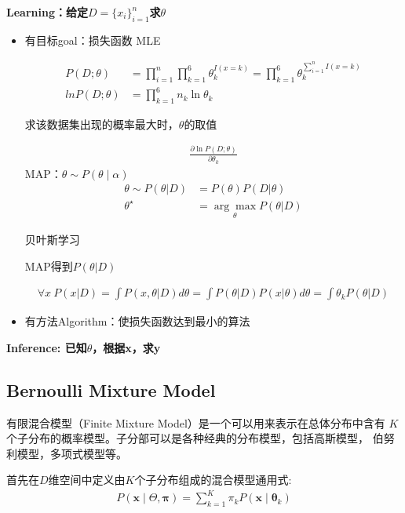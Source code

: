 \documentclass[UTF8]{ctexart}
\begin{document}
\textbf{Learning：给定$D=\{x_i\}_{i=1}^{n}$求$\theta$}
\begin{itemize}
    \item 有目标goal：损失函数
        \subitem MLE  
        
        $$
        \begin{aligned}
        P(D;\theta)&=\prod^{n}_{i=1}\prod^{6}_{k=1}\theta_k^{I(x=k)}=\prod^{6}_{k=1}\theta_k^{\sum^{n}_{i=1}I(x=k)}  \\
        lnP(D;\theta)&=\prod^{6}_{k=1}n_k\ln\theta_k
        \end{aligned}
        $$

        \subsubitem 求该数据集出现的概率最大时，$\theta$的取值
			
        $$
        \begin{aligned}
            \frac{\partial \ln P(D;\theta)}{\partial \theta_k}
        \end{aligned}
        $$ 
        \subitem MAP：$\theta \sim P(\theta\mid\alpha)$
        $$
        \begin{aligned}
        \theta\sim P(\theta|D)&=P(\theta)P(D|\theta)\\
        \theta^{\star}&=\underset{\theta}{\arg \max}P(\theta|D)
        \end{aligned}
        $$

        \subitem 贝叶斯学习

           \subsubitem MAP得到$P(\theta|D)$
			
            $$
            \begin{aligned}
                \forall x ~P(x|D)=\int P(x,\theta|D)d\theta=\int P(\theta|D)P(x|\theta)d\theta=\int \theta_kP(\theta|D)
            \end{aligned}
            $$
            
    \item 有方法Algorithm：使损失函数达到最小的算法
\end{itemize}


\textbf{Inference: 已知$\theta$，根据x，求y}

\subsection{Bernoulli Mixture Model}
有限混合模型（Finite Mixture Model）是一个可以用来表示在总体分布中含有
$K$个子分布的概率模型。子分部可以是各种经典的分布模型，包括高斯模型，
伯努利模型，多项式模型等。

首先在$D$维空间中定义由$K$个子分布组成的混合模型通用式:
$$
\begin{aligned}
P(\boldsymbol{x} \mid \Theta, \boldsymbol{\pi})=\sum_{k=1}^{K} \pi_{k} P\left(\boldsymbol{x} \mid \boldsymbol{\theta}_{k}\right)
\end{aligned}
$$
\end{document}
